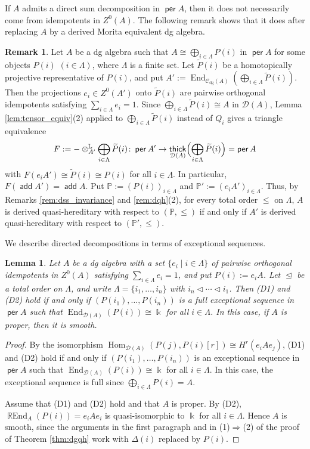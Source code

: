 \documentclass[a4paper,reqno,11pt]{amsart}
\numberwithin{equation}{section}
\newtheorem{lemma}[theorem]{Lemma}
\theoremstyle{definition}
\newtheorem{remark}[theorem]{Remark}
\newcommand{\C}{\mathcal{C}}
\newcommand{\D}{\mathcal{D}}
\newcommand{\LL}{\mathbb{L}}
\newcommand{\PP}{\mathbb{P}}
\newcommand{\bde}{\Delta}
\newcommand{\til}[1]{\widetilde{#1}}
\newcommand{\kk}{\Bbbk}
\DeclareMathOperator{\add}{\mathsf{add}}
\DeclareMathOperator{\thick}{\mathsf{thick}}
\DeclareMathOperator{\per}{\mathsf{per}}
\DeclareMathOperator{\End}{End}
\DeclareMathOperator{\REnd}{\mathbb{R}End}
\DeclareMathOperator{\Hom}{Hom}
\newcommand{\dgmod}{\C_{\mathrm{dg}}}
\begin{document}
If $A$ admits a direct sum decomposition in $\per A$, then it does not necessarily come from idempotents in $Z^{0}(A)$.
The following remark shows that it does after replacing $A$ by a derived Morita equivalent dg algebra.

\begin{remark}\label{rem:directed}
Let $A$ be a dg algebra such that $A\cong\bigoplus_{i\in\Lambda}P(i)$ in $\per A$ for some objects $P(i)$ $(i\in\Lambda)$, where $\Lambda$ is a finite set.
Let $\til{P}(i)$ be a homotopically projective representative of $P(i)$, and put $A':=\End_{\dgmod(A)}(\bigoplus_{i\in\Lambda}\til{P}(i))$.
Then the projections $e_{i}\in Z^{0}(A')$ onto $\til{P}(i)$ are pairwise orthogonal idempotents satisfying $\sum_{i\in\Lambda}e_{i}=1$.
Since $\bigoplus_{i\in\Lambda}\til{P}(i)\cong A$ in $\D(A)$, Lemma \ref{lem:tensor_equiv}(2) applied to $\bigoplus_{i\in\Lambda}\til{P}(i)$ instead of $Q_{i}$ gives a triangle equivalence
\begin{align}
F:=-\otimes^{\LL}_{A'}\bigoplus_{i\in\Lambda}\til{P}(i)\colon\per A'\to\thick_{\D(A)}\Bigl(\bigoplus_{i\in\Lambda}\til{P}(i)\Bigr)=\per A\notag
\end{align}
with $F(e_{i}A')\cong\til{P}(i)\cong P(i)$ for all $i\in\Lambda$.
In particular, $F(\add A')=\add A$.
Put $\PP:=(P(i))_{i\in\Lambda}$ and $\PP':=(e_{i}A')_{i\in\Lambda}$.
Thus, by Remarks \ref{rem:dss_invariance} and \ref{rem:dqh}(2), for every total order $\leq$ on $\Lambda$, $A$ is derived quasi-hereditary with respect to $(\PP,\leq)$ if and only if $A'$ is derived quasi-hereditary with respect to $(\PP',\leq)$.
\end{remark}

We describe directed decompositions in terms of exceptional sequences.

\begin{lemma}\label{lem:directed}
Let $A$ be a dg algebra with a set $\{e_{i}\mid i\in\Lambda\}$ of pairwise orthogonal idempotents in $Z^{0}(A)$ satisfying $\sum_{i\in\Lambda}e_{i}=1$, and put $P(i):=e_{i}A$.
Let $\trianglelefteq$ be a total order on $\Lambda$, and write $\Lambda=\{i_{1},\ldots,i_{n}\}$ with $i_{n}\triangleleft\cdots\triangleleft i_{1}$.
Then (D1) and (D2) hold if and only if $(P(i_{1}),\ldots,P(i_{n}))$ is a full exceptional sequence in $\per A$ such that $\End_{\D(A)}(P(i))\cong\kk$ for all $i\in\Lambda$.
In this case, if $A$ is proper, then it is smooth.
\end{lemma}
\begin{proof}
By the isomorphism $\Hom_{\D(A)}(P(j),P(i)[r])\cong H^{r}(e_{i}Ae_{j})$, (D1) and (D2) hold if and only if $(P(i_{1}),\ldots,P(i_{n}))$ is an exceptional sequence in $\per A$ such that $\End_{\D(A)}(P(i))\cong\kk$ for all $i\in\Lambda$.
In this case, the exceptional sequence is full since $\bigoplus_{i\in\Lambda}P(i)=A$.

Assume that (D1) and (D2) hold and that $A$ is proper.
By (D2), $\REnd_{A}(P(i))=e_{i}Ae_{i}$ is quasi-isomorphic to $\kk$ for all $i\in\Lambda$.
Hence $A$ is smooth, since the arguments in the first paragraph and in (1)$\Rightarrow$(2) of the proof of Theorem \ref{thm:dgqh} work with $\bde(i)$ replaced by $P(i)$.
\end{proof}
\end{document}
